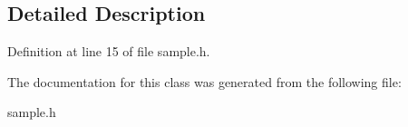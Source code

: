 \subsection{Detailed Description}


Definition at line 15 of file sample.\-h.



The documentation for this class was generated from the following file\-:\begin{DoxyCompactItemize}
\item 
sample.\-h\end{DoxyCompactItemize}
